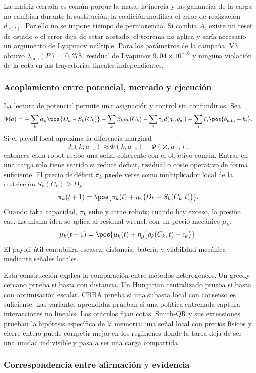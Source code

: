 La matriz cerrada es común porque la masa, la inercia y las ganancias de la carga no cambian durante la sustitución; la coalición modifica el error de realización $d_{\sigma(t)}$. Por ello no se impone tiempo de permanencia. Si cambia $A$, existe un reset de estado o el error deja de estar acotado, el teorema no aplica y sería necesario un argumento de Lyapunov múltiple. Para los parámetros de la campaña, V3 obtuvo $\lambda_{\min}(P)=0{,}278$, residual de Lyapunov $9{,}04\times10^{-16}$ y ninguna violación de la cota en las trayectorias lineales independientes.
\subsubsection{Acoplamiento entre potencial, mercado y ejecución}

La lectura de potencial permite unir asignación y control sin confundirlos. Sea
\[
  \Phi(a)=
  -\sum_k\alpha_k\pos{D_k-S_k(C_k)}
  -\sum_k\beta_k\rho_k(C_k)
  -\sum_i\gamma_i d(q_i,q_{a_i})
  -\sum_i\zeta_i\pos{b_{\min}-b_i}.
\]
Si el payoff local aproxima la diferencia marginal
\[
  J_i(k;a_{-i})\approx
  \Phi(k,a_{-i})-\Phi(\varnothing,a_{-i}),
\]
entonces cada robot recibe una señal coherente con el objetivo común. Entrar en una carga
solo tiene sentido si reduce déficit, residual o coste operativo de forma suficiente. El
precio de déficit $\pi_k$ puede verse como multiplicador local de la restricción
$S_k(C_k)\geq D_k$:
\[
  \pi_k(t+1)=\pos{\pi_k(t)+\eta_\pi\bigl(D_k-S_k(C_k,t)\bigr)}.
\]
Cuando falta capacidad, $\pi_k$ sube y atrae robots; cuando hay exceso, la presión cae.
La misma idea se aplica al residual wrench con un precio mecánico $\mu_k$:
\[
  \mu_k(t+1)=\pos{\mu_k(t)+\eta_\mu\bigl(\rho_k(C_k,t)-\epsilon_k\bigr)}.
\]
El payoff útil contabiliza escasez, distancia, batería y viabilidad mecánica mediante
señales locales.

Esta construcción explica la comparación entre métodos heterogéneos. Un greedy
cercano prueba si basta con distancia. Un Hungarian centralizado prueba si basta con
optimización escalar. CBBA prueba si una subasta local con consenso es suficiente. Las
variantes aprendidas prueban si una política entrenada captura interacciones no lineales.
Los oráculos fijan cotas. Smith-QR y sus extensiones prueban la hipótesis específica de
la memoria: una señal local con precios físicos y cierre entero puede competir mejor en
los regímenes donde la tarea deja de ser una unidad indivisible y pasa a ser una carga
compartida.

\subsubsection{Correspondencia entre afirmación y evidencia}

